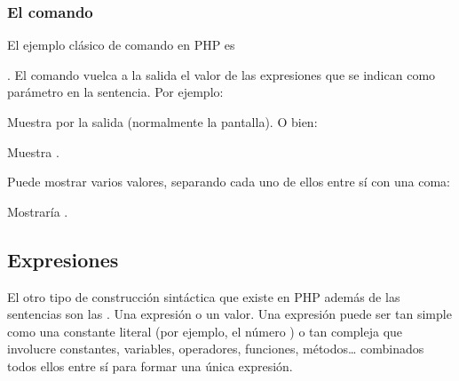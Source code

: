 \documentclass[a4paper,12pt,spanish]{sphinxmanual}
\begin{document}
\subsubsection{El comando }
\label{\detokenize{php:el-comando-echo}}
\ignorespaces 
El ejemplo clásico de comando en PHP es %
\begin{footnote}[1]\sphinxAtStartFootnote
{}
%
\end{footnote}. El comando  vuelca a
la salida el valor de las expresiones que se indican como parámetro en la
sentencia. Por ejemplo:

\begin{sphinxVerbatim}[commandchars=\\\{\}]
   
\end{sphinxVerbatim}

Muestra  por la salida (normalmente la pantalla). O bien:

\begin{sphinxVerbatim}[commandchars=\\\{\}]
 
\end{sphinxVerbatim}

Muestra .

Puede mostrar varios valores, separando cada uno de ellos entre sí con una
coma:

\begin{sphinxVerbatim}[commandchars=\\\{\}]
    
\end{sphinxVerbatim}

Mostraría .

\ignorespaces 

\subsection{Expresiones}
\label{\detokenize{php:expresiones}}\label{\detokenize{php:index-7}}
El otro tipo de construcción sintáctica que existe en PHP además de las
sentencias son las . Una expresión  o  un
valor. Una expresión puede ser tan simple como una constante literal (por
ejemplo, el número ) o tan compleja que involucre constantes, variables,
operadores, funciones, métodos… combinados todos ellos entre sí para formar
una única expresión.
\end{document}
